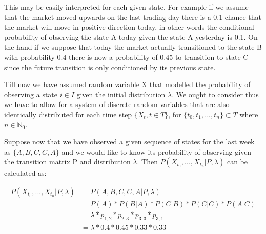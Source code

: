 \begin{center}
\end{center}
 
This may be easily interpreted for each given state. For example if we assume that the market moved upwards on the last trading day there is a 0.1 chance that the market will move in positive direction today, in other words the conditional probability of observing the state A today given the state A yesterday is 0.1. On the hand if we suppose that today the market actually transitioned to the state B  with probability 0.4 there is now a probability of 0.45 to transition to state C since the future transition is only conditioned by its previous state. 

Till now we have assumed random variable X that modelled the probability of observing a state $i \in I$ given the initial distribution $\lambda$. We ought to consider  thus we have to allow for a system of discrete random variables that are also identically distributed for each time step $\{X_{t},t \in T \}$, for $\{t_0,t_1,...,t_n\} \subset T$ where $n \in \mathbb{N}_0$.

Suppose now that we have observed a given sequence of states for the last week as $\{A,B,C,C,A\}$ and we would like to know its probability of observing given the transition matrix P and distribution $\lambda$. Then $P(X_{t_0},...,X_{t_n}|P,\lambda)$ can be calculated as:

\begin{align*}
P(X_{t_0},...,X_{t_n}|P,\lambda) &= P(A,B,C,C,A|P,\lambda) \\
&= P(A) * P(B|A) * P(C|B) * P(C|C) * P(A|C) \\
&= \lambda * p_{1,2} * p_{2,3} * p_{3,3} * p_{3,1} \\
&= \lambda * 0.4 * 0.45 * 0.33 * 0.33
\end{align*}

